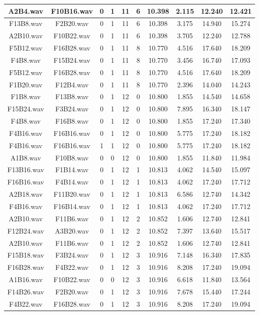 \documentclass[11pt,a4paper,twoside]{book}
\begin{document}
\begin{longtable}[c]{|c|c|c|c|c|c|c|c|c|c|}
A2B4.wav&F10B16.wav&0&1&11&6&10.398&2.115&12.240&12.421\\ \hline
F13B8.wav&F2B20.wav&0&1&11&6&10.398&3.175&14.940&15.274\\ \hline
A2B10.wav&F10B22.wav&0&1&11&6&10.398&3.705&12.240&12.788\\ \hline
F5B12.wav&F16B28.wav&0&1&11&8&10.770&4.516&17.640&18.209\\ \hline
F4B8.wav&F15B24.wav&0&1&11&8&10.770&3.456&16.740&17.093\\ \hline
F5B12.wav&F16B28.wav&0&1&11&8&10.770&4.516&17.640&18.209\\ \hline
F1B20.wav&F12B4.wav&0&1&11&8&10.770&2.396&14.040&14.243\\ \hline
F1B8.wav&F13B8.wav&0&1&12&0&10.800&1.855&14.540&14.658\\ \hline
F15B24.wav&F3B24.wav&0&1&12&0&10.800&7.895&16.340&18.147\\ \hline
F4B8.wav&F16B8.wav&0&1&12&0&10.800&1.855&17.240&17.340\\ \hline
F4B16.wav&F16B16.wav&0&1&12&0&10.800&5.775&17.240&18.182\\ \hline
F4B16.wav&F16B16.wav&1&1&12&0&10.800&5.775&17.240&18.182\\ \hline
A1B8.wav&F10B8.wav&0&0&12&0&10.800&1.855&11.840&11.984\\ \hline
F13B16.wav&F1B14.wav&0&1&12&1&10.813&4.062&14.540&15.097\\ \hline
F16B16.wav&F4B14.wav&0&1&12&1&10.813&4.062&17.240&17.712\\ \hline
A2B18.wav&F11B20.wav&0&1&12&1&10.813&6.586&12.740&14.342\\ \hline
F4B16.wav&F16B14.wav&0&1&12&1&10.813&4.062&17.240&17.712\\ \hline
A2B10.wav&F11B6.wav&0&1&12&2&10.852&1.606&12.740&12.841\\ \hline
F12B24.wav&A3B20.wav&0&1&12&2&10.852&7.397&13.640&15.517\\ \hline
A2B10.wav&F11B6.wav&0&1&12&2&10.852&1.606&12.740&12.841\\ \hline
F15B18.wav&F3B24.wav&0&1&12&3&10.916&7.148&16.340&17.835\\ \hline
F16B28.wav&F4B22.wav&0&1&12&3&10.916&8.208&17.240&19.094\\ \hline
A1B16.wav&F10B22.wav&0&0&12&3&10.916&6.618&11.840&13.564\\ \hline
F14B26.wav&F2B20.wav&0&1&12&3&10.916&7.678&15.440&17.244\\ \hline
F4B22.wav&F16B28.wav&0&1&12&3&10.916&8.208&17.240&19.094\\ \hline

\end{longtable}
\end{document}
